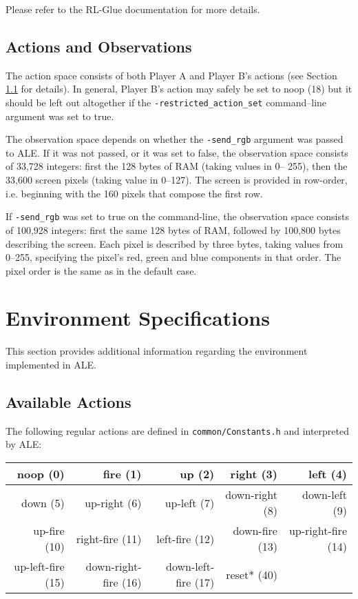 \documentclass[12pt]{article}
\begin{document}
Please refer to the RL-Glue documentation for more details. 


\subsection{Actions and Observations}

The action space consists of both Player A and Player B's actions (see Section 
\ref{sec:available_actions}
for details). In general, Player B's action may safely be set to noop (18) but it should be left out
altogether if the \verb+-restricted_action_set+ command--line argument was set to true. 

The observation space depends on whether the \verb+-send_rgb+ argument was passed to ALE. If it was
not passed,  or it was set to false, the observation space consists of 33,728 integers: first the
128 bytes of RAM (taking values in 0-- 255), then the 33,600 screen pixels (taking value in 0--127).
The screen is provided in row-order, i.e. beginning with the 160 pixels that compose the first row.

 If \verb+-send_rgb+ was set to true on the command-line, the observation space consists of 100,928 
 integers: first the same 128 bytes of RAM, followed by 100,800 bytes describing the screen.
 Each pixel is described by three bytes, taking values from 0--255, specifying the pixel's 
 red, green and blue components in that order. The pixel order is the same as in the default
 case.

\section{Environment Specifications}\label{sec:environment_specifications}

This section provides additional information regarding the environment implemented in ALE.

\subsection{Available Actions}\label{sec:available_actions}

The following regular actions are defined in \verb+common/Constants.h+ and interpreted by ALE:

\begin{center}
\begin{tabular}{|r|r|r|r|r|}
\hline
noop (0) & fire (1) & up (2) & right (3) & left (4) \\
\hline
down (5) & up-right (6) & up-left (7) & down-right (8) & down-left (9) \\
\hline
up-fire (10) & right-fire (11) & left-fire (12) & down-fire (13) & up-right-fire (14) \\
\hline
up-left-fire (15) & down-right-fire (16) & down-left-fire (17) & reset* (40) & \\
\hline
\end{tabular}
\end{center}
\end{document}
